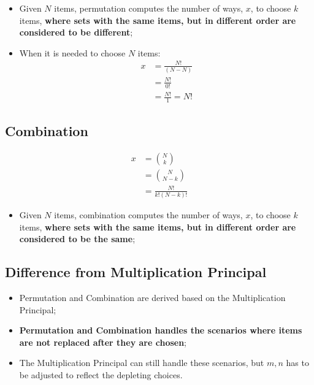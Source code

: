     \begin{itemize}
      \item Given $ N $ items, permutation computes the number of ways, $ x $, to choose $ k $ items, \textbf{where sets with the same items, but in different order are considered to be different};
      \item When it is needed to choose $ N $ items:
      \begin{align*}
        x &= \frac{N!}{\left( N - N \right)} \\
        &= \frac{N!}{0!} \\
        &= \frac{N!}{1} = N!
      \end{align*}
    \end{itemize}
    
  \subsection{Combination}
  
    \begin{align}
      x &= {N \choose k} \\
      &= {N \choose N - k} \\
      &= \frac{ N! }{ k! \left( N - k \right)! }
    \end{align}
    
    \begin{itemize}
      \item Given $ N $ items, combination computes the number of ways, $ x $, to choose $ k $ items, \textbf{where sets with the same items, but in different order are considered to be the same};
      
    \end{itemize}
      
  \subsection{Difference from Multiplication Principal}
    
      \begin{itemize}
        \item Permutation and Combination are derived based on the Multiplication Principal;
        \item \textbf{Permutation and Combination handles the scenarios where items are not replaced after they are chosen};
        \item The Multiplication Principal can still handle these scenarios, but $ m, n $ has to be adjusted to reflect the depleting choices.
      \end{itemize}
      
